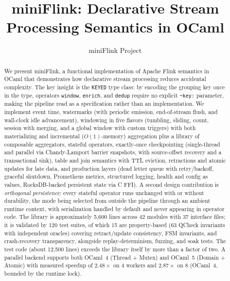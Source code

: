\documentclass[11pt,a4paper]{article}
\title{miniFlink: Declarative Stream Processing Semantics in OCaml}
\author{miniFlink Project}
\date{}
\begin{document}
\maketitle

\begin{abstract}
We present miniFlink, a functional implementation of Apache Flink semantics
in OCaml that demonstrates how declarative stream processing reduces
accidental complexity. The key insight is the \texttt{KEYED} type class:
by encoding the grouping key once in the type, operators \texttt{window},
\texttt{enrich}, and \texttt{dedup} require no explicit \texttt{\textasciitilde{}key:}
parameter, making the pipeline read as a specification rather than
an implementation. We implement event time, watermarks (with periodic
emission, end-of-stream flush, and wall-clock idle advancement),
windowing in five flavors (tumbling, sliding, count, session with
merging, and a global window with custom triggers) with both
materializing and incremental ($O(1)$-memory) aggregation plus a
library of composable aggregators, stateful
operators, exactly-once checkpointing (single-thread and parallel via
Chandy-Lamport barrier snapshots, with source-offset recovery and a
transactional sink), table and join semantics with TTL eviction,
retractions and atomic updates for late data, and production layers
(dead letter queue with retry/backoff, graceful shutdown, Prometheus
metrics, structured logging, health and config as values, RocksDB-backed
persistent state via C FFI). A second design contribution is
\emph{orthogonal persistence}: every stateful operator runs unchanged
with or without durability, the mode being selected from outside the
pipeline through an ambient runtime context, with serialization handled
by default and never appearing in operator code. The library is
approximately 5{,}600 lines across 42 modules with 37 interface files;
it is validated by 120 test suites, of which 15 are property-based
(63 QCheck invariants with independent oracles) covering retract/update
consistency, FSM invariants, and crash-recovery transparency, alongside
replay-determinism, fuzzing, and soak tests. The test code (about
12{,}500 lines) exceeds the library itself by more than a factor of two.
A parallel backend supports both OCaml~4 (Thread + Mutex)
and OCaml~5 (Domain + Atomic) with measured speedup of $2.48\times$ on
4 workers and $2.87\times$ on 8 (OCaml~4, bounded by the runtime lock).
\end{abstract}


\end{document}
